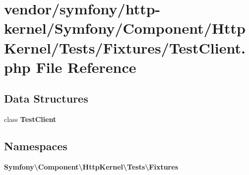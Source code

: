 \section{vendor/symfony/http-\/kernel/\+Symfony/\+Component/\+Http\+Kernel/\+Tests/\+Fixtures/\+Test\+Client.php File Reference}
\label{_test_client_8php}
\subsection*{Data Structures}
\begin{DoxyCompactItemize}
\item 
class {\bf Test\+Client}
\end{DoxyCompactItemize}
\subsection*{Namespaces}
\begin{DoxyCompactItemize}
\item 
 {\bf Symfony\textbackslash{}\+Component\textbackslash{}\+Http\+Kernel\textbackslash{}\+Tests\textbackslash{}\+Fixtures}
\end{DoxyCompactItemize}
